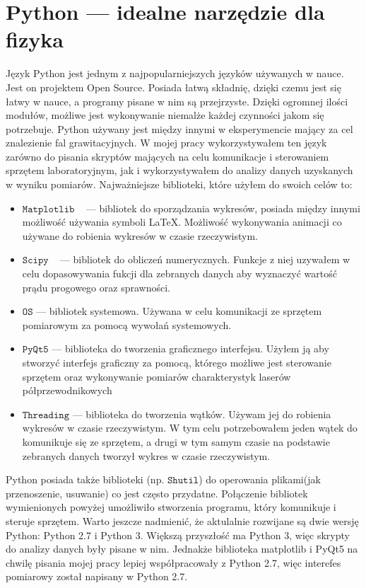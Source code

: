 \section{Python --- idealne narzędzie dla fizyka}
Język Python jest jednym z najpopularniejszych języków używanych w nauce. Jest on projektem Open Source. Posiada łatwą składnię,
dzięki czemu jest się łatwy w nauce, a programy pisane w nim są przejrzyste. Dzięki ogromnej ilości modułów,
możliwe jest wykonywanie niemalże każdej czynności jakom się potrzebuje. Python używany jest między innymi w
eksperymencie mający za cel znalezienie fal grawitacyjnych. W mojej pracy wykorzystywałem ten język zarówno
do pisania skryptów mających na celu komunikacje i sterowaniem sprzętem laboratoryjnym, jak i wykorzystywałem
do analizy danych uzyskanych w wyniku pomiarów.
Najważniejsze biblioteki, które użyłem do swoich celów to:
\begin{itemize}
\item $\mathtt{Matplotlib}$ ~\cite{matplotlib_book} --- bibliotek do sporządzania wykresów, posiada między innymi możliwość używania symboli \LaTeX.
Możliwość wykonywania animacji co używane do robienia wykresów w czasie rzeczywistym.
\item $\mathtt{Scipy}$ ~\cite{SciPy_book} --- bibliotek do obliczeń numerycznych. Funkcje z niej uzywałem w celu dopasowywania
fukcji dla zebranych danych aby wyznaczyć wartość prądu progowego oraz sprawności.
\item $\mathtt{OS}$ --- bibliotek systemowa. Używana w celu komunikacji ze sprzętem pomiarowym za pomocą wywołań systemowych.
\item $\mathtt{PyQt5}$ --- biblioteka do tworzenia graficznego interfejsu. Użyłem ją aby stworzyć interfejs graficzny za pomocą,
którego możliwe jest sterowanie sprzętem oraz wykonywanie pomiarów charakterystyk laserów półprzewodnikowych
\item $\mathtt{Threading}$ --- biblioteka do tworzenia wątków. Używam jej do robienia wykresów w czasie rzeczywistym.
W tym celu potrzebowałem jeden wątek do komunikuje się ze sprzętem, a drugi w tym samym czasie
na podstawie zebranych danych tworzył wykres w czasie rzeczywistym.
\end{itemize}
Python posiada także biblioteki (np. $\mathtt{Shutil}$) do operowania plikami(jak przenoszenie, usuwanie) co jest często przydatne.
Połączenie bibliotek wymienionych powyżej umożliwiło stworzenia programu, który komunikuje i steruje sprzętem.
Warto jeszcze nadmienić, że aktulalnie rozwijane są dwie wersję Python: Python 2.7 i Python 3. Większą przyszłość ma Python 3,
więc skrypty do analizy danych były pisane w nim. Jednakże biblioteka matplotlib i PyQt5 na chwilę pisania mojej
pracy lepiej współpracowały z Python 2.7, więc interefes pomiarowy został napisany w Python 2.7.
